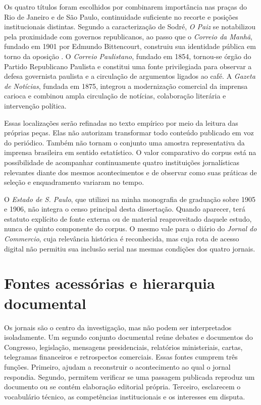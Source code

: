 Os quatro títulos foram escolhidos por combinarem importância nas praças do Rio de Janeiro e de São Paulo, continuidade suficiente no recorte e posições institucionais distintas. Segundo a caracterização de Sodré, \textit{O Paiz} se notabilizou pela proximidade com governos republicanos, ao passo que o \textit{Correio da Manhã}, fundado em 1901 por Edmundo Bittencourt, construiu sua identidade pública em torno da oposição \cite{sodre1966}. O \textit{Correio Paulistano}, fundado em 1854, tornou-se órgão do Partido Republicano Paulista e constitui uma fonte privilegiada para observar a defesa governista paulista e a circulação de argumentos ligados ao café. A \textit{Gazeta de Notícias}, fundada em 1875, integrou a modernização comercial da imprensa carioca e combinou ampla circulação de notícias, colaboração literária e intervenção política.

Essas localizações serão refinadas no texto empírico por meio da leitura das próprias peças. Elas não autorizam transformar todo conteúdo publicado em voz do periódico. Também não tornam o conjunto uma amostra representativa da imprensa brasileira em sentido estatístico. O valor comparativo do corpus está na possibilidade de acompanhar continuamente quatro instituições jornalísticas relevantes diante dos mesmos acontecimentos e de observar como suas práticas de seleção e enquadramento variaram no tempo.

O \textit{Estado de S. Paulo}, que utilizei na minha monografia de graduação sobre 1905 e 1906, não integra o censo principal desta dissertação. Quando aparecer, terá estatuto explícito de fonte externa ou de material reaproveitado daquele estudo, nunca de quinto componente do corpus. O mesmo vale para o diário do \textit{Jornal do Commercio}, cuja relevância histórica é reconhecida, mas cuja rota de acesso digital não permitiu sua inclusão serial nas mesmas condições dos quatro jornais.

\section{Fontes acessórias e hierarquia documental}

Os jornais são o centro da investigação, mas não podem ser interpretados isoladamente. Um segundo conjunto documental reúne debates e documentos do Congresso, legislação, mensagens presidenciais, relatórios ministeriais, cartas, telegramas financeiros e retrospectos comerciais. Essas fontes cumprem três funções. Primeiro, ajudam a reconstruir o acontecimento ao qual o jornal respondia. Segundo, permitem verificar se uma passagem publicada reproduz um documento ou se contém elaboração editorial própria. Terceiro, esclarecem o vocabulário técnico, as competências institucionais e os interesses em disputa.

